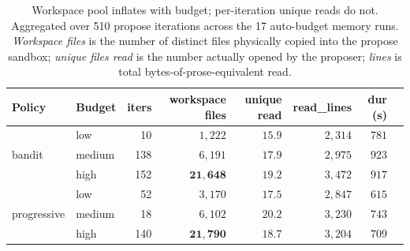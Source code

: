 \begin{table}[t]
\centering
\small
\caption{Workspace pool inflates with budget; per-iteration unique
reads do not. Aggregated over 510 propose iterations across the 17
auto-budget memory runs. \emph{Workspace files} is the number of
distinct files physically copied into the propose sandbox; \emph{unique
files read} is the number actually opened by the proposer; \emph{lines}
is total bytes-of-prose-equivalent read.}
\label{tab:focus_not_volume}
\begin{tabular}{@{}llrrrrrr@{}}
\toprule
Policy & Budget & iters & workspace files & unique read & read\_lines & dur (s) \\
\midrule
\multirow{3}{*}{bandit}      & low    & 10  & $1{,}222$  & $15.9$ & $2{,}314$ & $781$ \\
                              & medium & 138 & $6{,}191$  & $17.9$ & $2{,}975$ & $923$ \\
                              & high   & 152 & $\mathbf{21{,}648}$ & $\mathbf{19.2}$ & $3{,}472$ & $917$ \\
\midrule
\multirow{3}{*}{progressive} & low    & 52  & $3{,}170$  & $17.5$ & $2{,}847$ & $615$ \\
                              & medium & 18  & $6{,}102$  & $20.2$ & $3{,}230$ & $743$ \\
                              & high   & 140 & $\mathbf{21{,}790}$ & $18.7$ & $3{,}204$ & $709$ \\
\bottomrule
\end{tabular}
\end{table}

